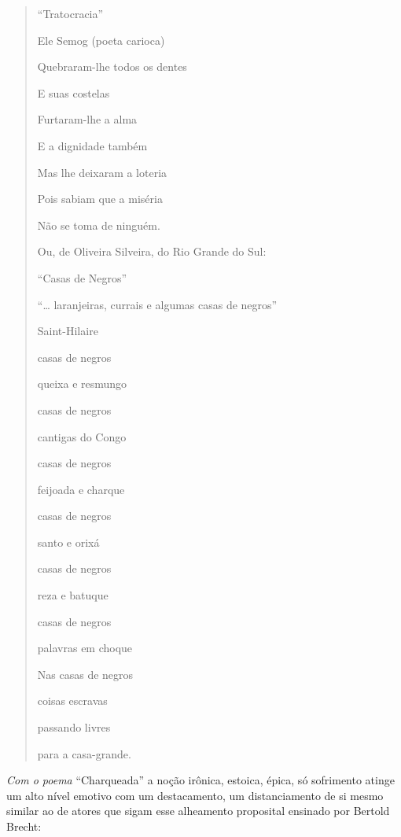 \documentclass[
  letterpaper,
  DIV=11,
  numbers=noendperiod]{scrreprt}
\begin{document}
\begin{quote}
``Tratocracia''~

Ele Semog (poeta carioca)~

Quebraram-lhe todos os dentes~

E suas costelas~

Furtaram-lhe a alma~

E a dignidade também~

Mas lhe deixaram a loteria~

Pois sabiam que a miséria~

Não se toma de ninguém.~

Ou, de Oliveira Silveira, do Rio Grande do Sul:~

``Casas de Negros''~

``\ldots{} laranjeiras, currais e algumas casas de negros''~

Saint-Hilaire~

casas de negros~

queixa e resmungo~

casas de negros~

cantigas do Congo~

casas de negros~

feijoada e charque~

casas de negros~

santo e orixá~

casas de negros~

reza e batuque~

casas de negros~

palavras em choque~

Nas casas de negros~

coisas escravas~

passando livres~

para a casa-grande.
\end{quote}

\emph{Com o poema} ``Charqueada'' a noção irônica, estoica, épica, só
sofrimento atinge um alto nível emotivo com um destacamento, um
distanciamento de si mesmo similar ao de atores que sigam esse
alheamento proposital ensinado por Bertold Brecht:
\end{document}
